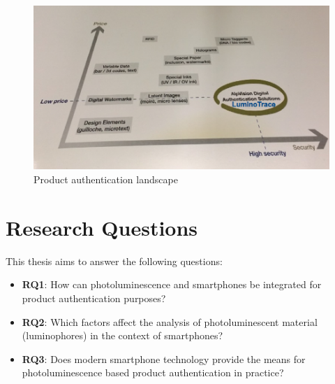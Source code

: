 \documentclass[thesis.tex]{subfiles}
\begin{document}
\begin{figure}[h!]
\centering \includegraphics[width=\linewidth]{images/landscape}
\caption{Product authentication landscape \label{fig:landscape}}
\end{figure}

\clearpage
\section{Research Questions}
\label{chapter:research-questions}

This thesis aims to answer the following questions:

\begin{itemize}
  \item \label{RQ1} \textbf{RQ1}: How can photoluminescence and smartphones be integrated for product authentication purposes?
  \item \label{RQ2} \textbf{RQ2}: Which factors affect the analysis of photoluminescent material (luminophores) in the context of smartphones?
  \item \label{RQ3} \textbf{RQ3}: Does modern smartphone technology provide the means for photoluminescence based product authentication in practice?
\end{itemize}
\end{document}
